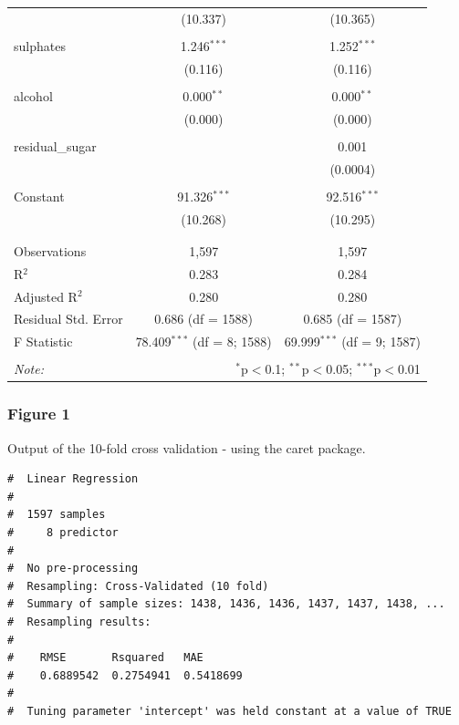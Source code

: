 \documentclass[a4paper,9pt,twocolumn,twoside,]{pinp}
\begin{document}
\begin{table}[!htbp]
\begin{tabular}{@{\extracolsep{5pt}}lcc}
  & (10.337) & (10.365) \\ 
  & & \\ 
 sulphates & 1.246$^{***}$ & 1.252$^{***}$ \\ 
  & (0.116) & (0.116) \\ 
  & & \\ 
 alcohol & 0.000$^{**}$ & 0.000$^{**}$ \\ 
  & (0.000) & (0.000) \\ 
  & & \\ 
 residual\_sugar &  & 0.001 \\ 
  &  & (0.0004) \\ 
  & & \\ 
 Constant & 91.326$^{***}$ & 92.516$^{***}$ \\ 
  & (10.268) & (10.295) \\ 
  & & \\ 
\hline \\[-1.8ex] 
Observations & 1,597 & 1,597 \\ 
R$^{2}$ & 0.283 & 0.284 \\ 
Adjusted R$^{2}$ & 0.280 & 0.280 \\ 
Residual Std. Error & 0.686 (df = 1588) & 0.685 (df = 1587) \\ 
F Statistic & 78.409$^{***}$ (df = 8; 1588) & 69.999$^{***}$ (df = 9; 1587) \\ 
\hline 
\hline \\[-1.8ex] 
\textit{Note:}  & \multicolumn{2}{r}{$^{*}$p$<$0.1; $^{**}$p$<$0.05; $^{***}$p$<$0.01} \\ 
\end{tabular} 
\end{table}

\hypertarget{figure-1}{%
\subsubsection{Figure 1}\label{figure-1}}

Output of the 10-fold cross validation - using the caret package.

\begin{ShadedResult}
\begin{verbatim}
#  Linear Regression 
#  
#  1597 samples
#     8 predictor
#  
#  No pre-processing
#  Resampling: Cross-Validated (10 fold) 
#  Summary of sample sizes: 1438, 1436, 1436, 1437, 1437, 1438, ... 
#  Resampling results:
#  
#    RMSE       Rsquared   MAE      
#    0.6889542  0.2754941  0.5418699
#  
#  Tuning parameter 'intercept' was held constant at a value of TRUE
\end{verbatim}
\end{ShadedResult}





\end{document}
